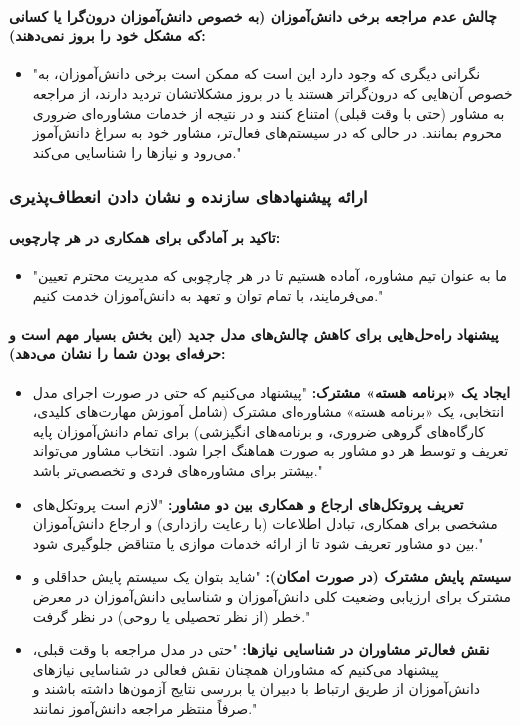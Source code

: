 \documentclass[12pt]{article}
\begin{document}
\paragraph{چالش عدم مراجعه برخی دانش‌آموزان (به خصوص دانش‌آموزان درون‌گرا یا کسانی که مشکل خود را بروز نمی‌دهند):}
\begin{itemize}
    \item "نگرانی دیگری که وجود دارد این است که ممکن است برخی دانش‌آموزان، به خصوص آن‌هایی که درون‌گراتر هستند یا در بروز مشکلاتشان تردید دارند، از مراجعه به مشاور (حتی با وقت قبلی) امتناع کنند و در نتیجه از خدمات مشاوره‌ای ضروری محروم بمانند. در حالی که در سیستم‌های فعال‌تر، مشاور خود به سراغ دانش‌آموز می‌رود و نیازها را شناسایی می‌کند."
\end{itemize}

\subsubsection*{ارائه پیشنهادهای سازنده و نشان دادن انعطاف‌پذیری}

\paragraph{تاکید بر آمادگی برای همکاری در هر چارچوبی:}
\begin{itemize}
    \item "ما به عنوان تیم مشاوره، آماده هستیم تا در هر چارچوبی که مدیریت محترم تعیین می‌فرمایند، با تمام توان و تعهد به دانش‌آموزان خدمت کنیم."
\end{itemize}

\paragraph{پیشنهاد راه‌حل‌هایی برای کاهش چالش‌های مدل جدید (این بخش بسیار مهم است و حرفه‌ای بودن شما را نشان می‌دهد):}
\begin{itemize}
    \item \textbf{ایجاد یک «برنامه هسته» مشترک:} "پیشنهاد می‌کنیم که حتی در صورت اجرای مدل انتخابی، یک «برنامه هسته» مشاوره‌ای مشترک (شامل آموزش مهارت‌های کلیدی، کارگاه‌های گروهی ضروری، و برنامه‌های انگیزشی) برای تمام دانش‌آموزان پایه تعریف و توسط هر دو مشاور به صورت هماهنگ اجرا شود. انتخاب مشاور می‌تواند بیشتر برای مشاوره‌های فردی و تخصصی‌تر باشد."
    \item \textbf{تعریف پروتکل‌های ارجاع و همکاری بین دو مشاور:} "لازم است پروتکل‌های مشخصی برای همکاری، تبادل اطلاعات (با رعایت رازداری) و ارجاع دانش‌آموزان بین دو مشاور تعریف شود تا از ارائه خدمات موازی یا متناقض جلوگیری شود."
    \item \textbf{سیستم پایش مشترک (در صورت امکان):} "شاید بتوان یک سیستم پایش حداقلی و مشترک برای ارزیابی وضعیت کلی دانش‌آموزان و شناسایی دانش‌آموزان در معرض خطر (از نظر تحصیلی یا روحی) در نظر گرفت."
    \item \textbf{نقش فعال‌تر مشاوران در شناسایی نیازها:} "حتی در مدل مراجعه با وقت قبلی، پیشنهاد می‌کنیم که مشاوران همچنان نقش فعالی در شناسایی نیازهای دانش‌آموزان از طریق ارتباط با دبیران یا بررسی نتایج آزمون‌ها داشته باشند و صرفاً منتظر مراجعه دانش‌آموز نمانند."
\end{itemize}
\end{document}
